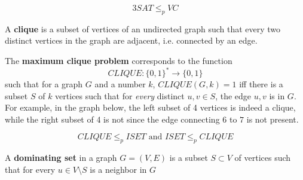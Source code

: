  \begin{theorem}
  \[3SAT \leq_p VC\]
  \end{theorem}

  \begin{definition}
  A \textbf{clique} is a subset of vertices of an undirected graph such that every two distinct vertices in the graph are adjacent, i.e. connected by an edge. 

  The \textbf{maximum clique problem} corresponds to the function 
  \[CLIQUE: \{0,1\}^* \longrightarrow \{0,1\}\]
  such that for a graph $G$ and a number $k$, $CLIQUE(G, k) = 1$ iff there is a subset $S$ of $k$ vertices such that for \textit{every} distinct $u, v \in S$, the edge $u, v$ is in $G$. For example, in the graph below, the left subset of 4 vertices is indeed a clique, while the right subset of 4 is not since the edge connecting $6$ to $7$ is not present. 
  \begin{center}
  \end{center}
  \end{definition}

  \begin{theorem}
  \[CLIQUE \leq_p ISET \text{ and } ISET \leq_p CLIQUE\]
  \end{theorem}

  \begin{definition}
  A \textbf{dominating set} in a graph $G = (V, E)$ is a subset $S \subset V$ of vertices such that for every $u \in V \setminus S$ is a neighbor in $G$ 
  \end{definition}

